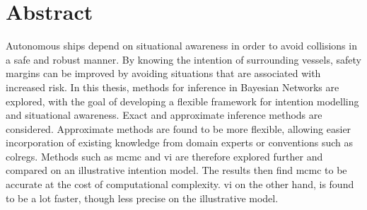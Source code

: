 \chapter*{Abstract}

Autonomous ships depend on situational awareness in order to avoid collisions in a safe and robust manner. By knowing the intention of surrounding vessels, safety margins can be improved by avoiding situations that are associated with increased risk. In this thesis, methods for inference in Bayesian Networks are explored, with the goal of developing a flexible framework for intention modelling and situational awareness. Exact and approximate inference methods are considered. Approximate methods are found to be more flexible, allowing easier incorporation of existing knowledge from domain experts or conventions such as \Gls{colregs}. Methods such as \acrfull{mcmc} and \acrfull{vi} are therefore explored further and compared on an illustrative intention model. The results then find \acrshort{mcmc} to be accurate at the cost of computational complexity. \acrshort{vi} on the other hand, is found to be a lot faster, though less precise on the illustrative model. 
